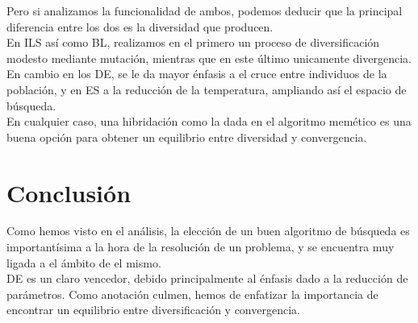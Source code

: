 Pero si analizamos la funcionalidad de ambos, podemos deducir que la principal diferencia entre los dos es la diversidad que producen. \\ 
En ILS así como BL, realizamos en el primero un proceso de diversificación modesto mediante mutación, mientras que en este último unicamente divergencia. \\ 

En cambio en los DE, se le da mayor énfasis a el cruce entre individuos de la población, y en ES a la reducción de la temperatura,  ampliando así el espacio de búsqueda. \\ 
En cualquier caso, una hibridación como la dada en el algoritmo memético es una buena opción para obtener un equilibrio entre diversidad y convergencia.



\section{Conclusión}
Como hemos visto en el análisis, la elección de un buen algoritmo de búsqueda es importantísima a la hora de la resolución de un problema, y se encuentra muy ligada a el ámbito de el mismo.\\ 

DE es un claro vencedor, debido principalmente al énfasis dado a la reducción de parámetros. 
Como anotación culmen, hemos de enfatizar la importancia de encontrar un equilibrio entre diversificación y convergencia.


